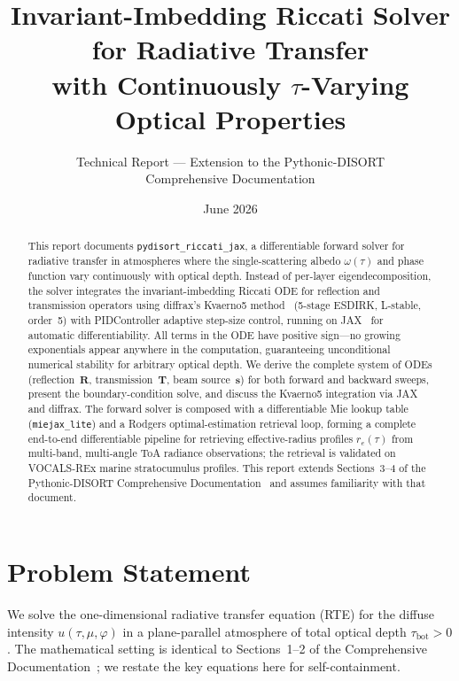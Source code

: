 \documentclass[11pt,a4paper]{article}
\title{Invariant-Imbedding Riccati Solver for Radiative Transfer\\
with Continuously $\tau$-Varying Optical Properties}
\author{Technical Report --- Extension to the Pythonic-DISORT\\
Comprehensive Documentation}
\date{June 2026}
\newcommand{\vect}[1]{\bm{#1}}
\newcommand{\mat}[1]{\mathbf{#1}}
\newcommand{\tbot}{\tau_{\mathrm{bot}}}
\theoremstyle{definition}
\begin{document}
\maketitle

\begin{abstract}
This report documents \texttt{pydisort\_riccati\_jax}, a differentiable
forward solver for radiative transfer in atmospheres where the
single-scattering albedo $\omega(\tau)$ and phase function vary
continuously with optical depth.  Instead of per-layer eigendecomposition,
the solver integrates the invariant-imbedding Riccati ODE for reflection and
transmission operators using diffrax's Kvaerno5 method~\cite{kidger2022neural}
(5-stage ESDIRK, L-stable, order~5) with PIDController adaptive step-size
control, running on JAX~\cite{jax2018github} for automatic differentiability.
All terms in the ODE have positive sign---no growing exponentials appear
anywhere in the computation, guaranteeing unconditional numerical stability
for arbitrary optical depth.  We derive the complete system of ODEs
(reflection~$\mat{R}$, transmission~$\mat{T}$, beam source~$\vect{s}$) for
both forward and backward sweeps, present the boundary-condition solve, and
discuss the Kvaerno5 integration via JAX and diffrax.  The forward solver is
composed with a differentiable Mie lookup table (\texttt{miejax\_lite}) and a
Rodgers optimal-estimation retrieval loop, forming a complete end-to-end
differentiable pipeline for retrieving effective-radius profiles $r_e(\tau)$
from multi-band, multi-angle ToA radiance observations; the retrieval is
validated on VOCALS-REx marine stratocumulus profiles.  This report extends
Sections~3--4 of the Pythonic-DISORT Comprehensive
Documentation~\cite{HP2024doc} and assumes familiarity with that document.
\end{abstract}

\tableofcontents
\vspace{1em}

\section{Problem Statement}\label{sec:problem}

We solve the one-dimensional radiative transfer equation (RTE) for the
diffuse intensity $u(\tau, \mu, \varphi)$ in a plane-parallel atmosphere
of total optical depth $\tbot > 0$.  The mathematical setting is
identical to Sections~1--2 of the Comprehensive
Documentation~\cite{HP2024doc}; we restate the key equations here for
self-containment.
\end{document}
